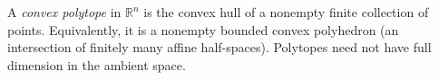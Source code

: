 
A \emph{convex polytope} in $\mathbb R^n$ is the convex hull of a nonempty finite collection of points. Equivalently, it is a nonempty bounded convex polyhedron (an intersection of finitely many affine half-spaces). Polytopes need not have full dimension in the ambient space.

